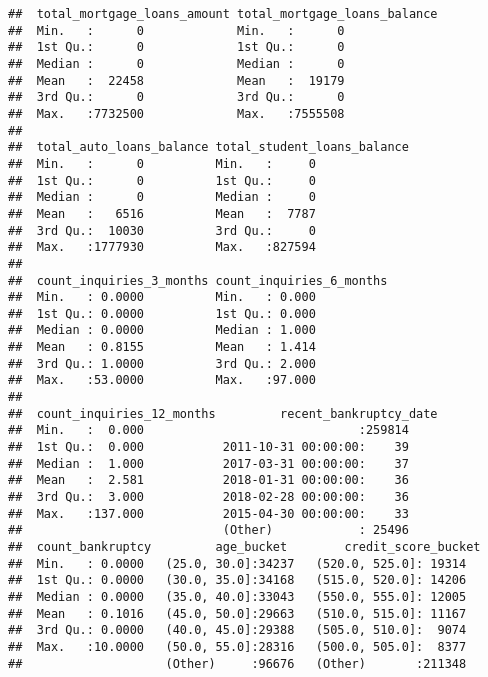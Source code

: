 \documentclass[ignorenonframetext,]{beamer}
\begin{document}
\begin{frame}[fragile]
\begin{verbatim}
##  total_mortgage_loans_amount total_mortgage_loans_balance
##  Min.   :      0             Min.   :      0             
##  1st Qu.:      0             1st Qu.:      0             
##  Median :      0             Median :      0             
##  Mean   :  22458             Mean   :  19179             
##  3rd Qu.:      0             3rd Qu.:      0             
##  Max.   :7732500             Max.   :7555508             
##                                                          
##  total_auto_loans_balance total_student_loans_balance
##  Min.   :      0          Min.   :     0             
##  1st Qu.:      0          1st Qu.:     0             
##  Median :      0          Median :     0             
##  Mean   :   6516          Mean   :  7787             
##  3rd Qu.:  10030          3rd Qu.:     0             
##  Max.   :1777930          Max.   :827594             
##                                                      
##  count_inquiries_3_months count_inquiries_6_months
##  Min.   : 0.0000          Min.   : 0.000          
##  1st Qu.: 0.0000          1st Qu.: 0.000          
##  Median : 0.0000          Median : 1.000          
##  Mean   : 0.8155          Mean   : 1.414          
##  3rd Qu.: 1.0000          3rd Qu.: 2.000          
##  Max.   :53.0000          Max.   :97.000          
##                                                   
##  count_inquiries_12_months         recent_bankruptcy_date
##  Min.   :  0.000                              :259814    
##  1st Qu.:  0.000           2011-10-31 00:00:00:    39    
##  Median :  1.000           2017-03-31 00:00:00:    37    
##  Mean   :  2.581           2018-01-31 00:00:00:    36    
##  3rd Qu.:  3.000           2018-02-28 00:00:00:    36    
##  Max.   :137.000           2015-04-30 00:00:00:    33    
##                            (Other)            : 25496    
##  count_bankruptcy         age_bucket        credit_score_bucket
##  Min.   : 0.0000   (25.0, 30.0]:34237   (520.0, 525.0]: 19314  
##  1st Qu.: 0.0000   (30.0, 35.0]:34168   (515.0, 520.0]: 14206  
##  Median : 0.0000   (35.0, 40.0]:33043   (550.0, 555.0]: 12005  
##  Mean   : 0.1016   (45.0, 50.0]:29663   (510.0, 515.0]: 11167  
##  3rd Qu.: 0.0000   (40.0, 45.0]:29388   (505.0, 510.0]:  9074  
##  Max.   :10.0000   (50.0, 55.0]:28316   (500.0, 505.0]:  8377  
##                    (Other)     :96676   (Other)       :211348
\end{verbatim}

\end{frame}
\end{document}
